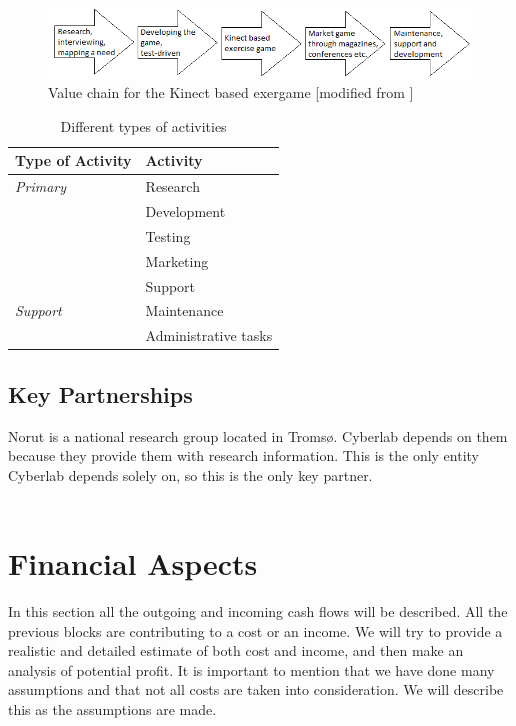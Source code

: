 \begin{figure}
\begin{center}
\includegraphics[scale=0.7]{valuechaincase}
\caption[Value Chain for the Kinect Based Exergame]{Value chain for the Kinect based exergame [modified from \cite{osterwalderthesis}]}
\label{fig:ValueChainCase}
\end{center}
\end{figure}

\begin{table}
\centering
    \begin{tabular}{|l|l|}
        \hline
        \textbf{Type of Activity} & \textbf{Activity} \\ \hline
        \emph{Primary} & Research \\ \cline{2-2}
        & Development \\ \cline{2-2}
	 	& Testing \\ \cline{2-2}
	 	& Marketing \\ \cline{2-2}
	 	& Support \\ \hline
	 	 \emph{Support} & Maintenance \\ \cline{2-2}
	   	& Administrative tasks \\ 	 
       \hline
    \end{tabular}
    \caption[Different types of activities ]{Different types of activities}
    \label{tab:activities}
\end{table}

\newpage

\subsection{Key Partnerships}

Norut is a national research group located in Tromsø. Cyberlab depends on them because they provide them with research information. This is the only entity Cyberlab depends solely on, so this is the only key partner. \\ \\ 

\section{Financial Aspects}
In this section all the outgoing and incoming cash flows will be described. All the previous blocks are contributing to a cost or an income. We will try to provide a realistic and detailed estimate of both cost and income, and then make an analysis of potential profit. It is important to mention that we have done many assumptions and that not all costs are taken into consideration. We will describe this as the assumptions are made.

